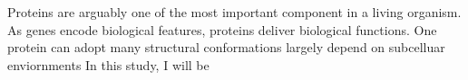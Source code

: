 Proteins are arguably one of the most important component in a living organism. As genes encode biological features, proteins deliver biological functions. One protein can adopt many structural conformations largely depend on subcelluar enviornments    In this study, I will be 